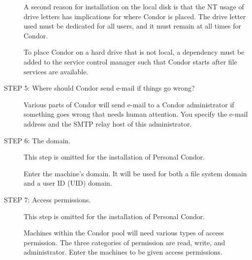\begin{description}
A second reason for installation on the local disk is that
the NT usage of drive letters has implications for where
Condor is placed.
The drive letter used must be dedicated for all users,
and it must remain at all times for Condor.

To place Condor on a hard drive that is not local,
a dependency must be added to the service control
manager such that Condor starts after file services
are available.



\item[STEP 5: Where should Condor send e-mail if things go wrong?]

     Various parts of Condor will send e-mail to a Condor administrator
     if something goes wrong that needs human attention.
     You specify the e-mail address and the SMTP relay host
     of this administrator.

\item[STEP 6: The domain.]

     This step is omitted for the installation of Personal Condor.

     Enter the machine's domain.
     It will be used for both a file system domain and
     a user ID (UID) domain.

\item[STEP 7: Access permissions.]
     This step is omitted for the installation of Personal Condor.

     Machines within the Condor pool will need
     various types of access permission. 
     The three categories of permission are read, write,
     and administrator. Enter the machines to be given
     access permissions.


\end{description}
